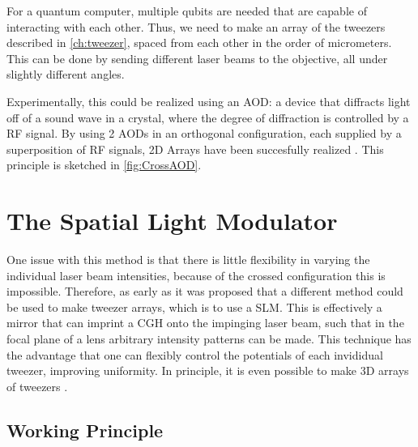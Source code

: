 For a quantum computer, multiple qubits are needed that are capable of interacting with each other. 
Thus, we need to make an array of the tweezers described in \cref{ch:tweezer}, spaced from each other in the order of micrometers. 
This can be done by sending different laser beams to the objective, all under slightly different angles. 

Experimentally, this could be realized using an \ac{AOD}: a device that diffracts light off of a sound wave in a crystal, where the degree of diffraction is controlled by a \ac{RF} signal. 
By using 2 AODs in an orthogonal configuration, each supplied by a superposition of RF signals, 2D Arrays have been succesfully realized \cite{Manuel2016}. 
This principle is sketched in \cref{fig:CrossAOD}.

\section{The Spatial Light Modulator}

One issue with this method is that there is little flexibility in varying the individual laser beam intensities, because of the crossed configuration this is impossible. 
Therefore, as early as \cite{Bergamini2004} it was proposed that a different method could be used to make tweezer arrays, which is to use a \ac{SLM}. 
This is effectively a mirror that can imprint a \ac{CGH} onto the impinging laser beam, such that in the focal plane of a lens arbitrary intensity patterns can be made. This technique has the advantage that one can flexibly control the potentials of each invididual tweezer, improving uniformity. 
In principle, it is even possible to make 3D arrays of tweezers \cite{DiLeonardo2007,Barredo2016}.

\subsection{Working Principle}

